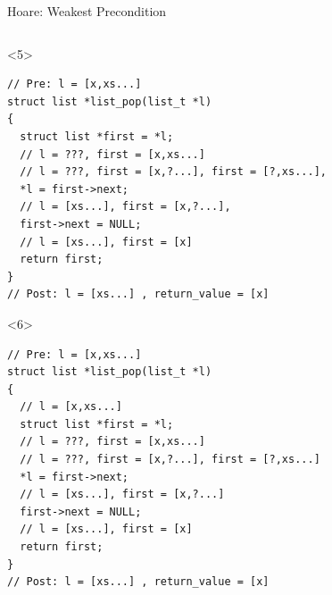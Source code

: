 \documentclass[hyperref={pdfpagelabels=false}]{beamer}
\begin{document}
\begin{frame}[fragile]{Hoare: Weakest Precondition}
\begin{onlyenv}
\begin{verbatim}
    \end{verbatim}
  \end{onlyenv}

  \begin{onlyenv}<5>
    \begin{verbatim}
// Pre: l = [x,xs...]
struct list *list_pop(list_t *l)
{
  struct list *first = *l;
  // l = ???, first = [x,xs...]
  // l = ???, first = [x,?...], first = [?,xs...],
  *l = first->next;
  // l = [xs...], first = [x,?...],
  first->next = NULL;
  // l = [xs...], first = [x]
  return first; 
}
// Post: l = [xs...] , return_value = [x]

    \end{verbatim}
  \end{onlyenv}

  \begin{onlyenv}<6>
    \begin{verbatim}
// Pre: l = [x,xs...]
struct list *list_pop(list_t *l)
{
  // l = [x,xs...]
  struct list *first = *l;
  // l = ???, first = [x,xs...]
  // l = ???, first = [x,?...], first = [?,xs...]
  *l = first->next;
  // l = [xs...], first = [x,?...]
  first->next = NULL;
  // l = [xs...], first = [x]
  return first; 
}
// Post: l = [xs...] , return_value = [x]

    \end{verbatim}
  \end{onlyenv}
\end{frame}
\end{document}
